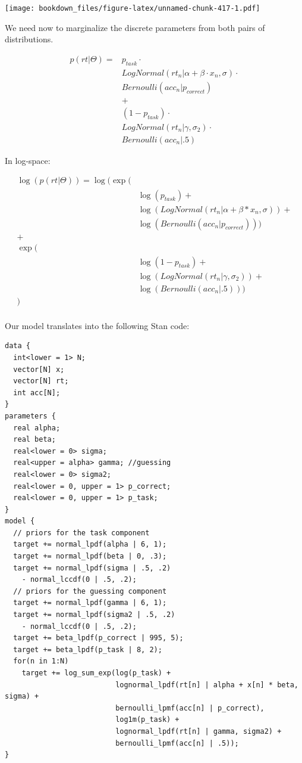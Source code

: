 \documentclass[12pt,]{krantz}
\theoremstyle{definition}
\theoremstyle{definition}
\theoremstyle{definition}
\theoremstyle{remark}
\begin{document}
\texttt{[image: bookdown\_files/figure-latex/unnamed-chunk-417-1.pdf]}

We need now to marginalize the discrete parameters from both pairs of
distributions.

\begin{equation}
\begin{aligned}
p(rt | \Theta) = & p_{task} \cdot \\
& LogNormal(rt_n | \alpha + \beta \cdot x_n, \sigma) \cdot \\
& Bernoulli(acc_n | p_{correct}) \\
& +\\ 
& (1 - p_{task}) \cdot \\
& LogNormal(rt_n | \gamma, \sigma_2) \cdot\\
& Bernoulli(acc_n | .5)
\end{aligned}
\end{equation}

In log-space:

\begin{equation}
\begin{aligned}
\log(p(rt | \Theta)) =  \log(\exp(&\\
& \log(p_{task}) +\\
  &\log(LogNormal(rt_n | \alpha + \beta * x_n, \sigma)) + \\
  &\log(Bernoulli(acc_n | p_{correct})))\\
  +&\\ 
 \exp(&\\
 & \log(1 - p_{task}) + \\
 & \log(LogNormal(rt_n |\gamma, \sigma_2)) + \\
 & \log(Bernoulli(acc_n | .5)))\\
    )& \\
\end{aligned}
\end{equation}

Our model translates into the following Stan code:

\begin{verbatim}
data {
  int<lower = 1> N;
  vector[N] x;
  vector[N] rt;
  int acc[N];
}
parameters {
  real alpha;
  real beta;
  real<lower = 0> sigma;
  real<upper = alpha> gamma; //guessing
  real<lower = 0> sigma2;
  real<lower = 0, upper = 1> p_correct;
  real<lower = 0, upper = 1> p_task;
}
model {
  // priors for the task component
  target += normal_lpdf(alpha | 6, 1);
  target += normal_lpdf(beta | 0, .3);
  target += normal_lpdf(sigma | .5, .2)
    - normal_lccdf(0 | .5, .2);
  // priors for the guessing component
  target += normal_lpdf(gamma | 6, 1);
  target += normal_lpdf(sigma2 | .5, .2)
    - normal_lccdf(0 | .5, .2);
  target += beta_lpdf(p_correct | 995, 5);
  target += beta_lpdf(p_task | 8, 2);
  for(n in 1:N)
    target += log_sum_exp(log(p_task) +
                          lognormal_lpdf(rt[n] | alpha + x[n] * beta, sigma) +
                          bernoulli_lpmf(acc[n] | p_correct),
                          log1m(p_task) +
                          lognormal_lpdf(rt[n] | gamma, sigma2) +
                          bernoulli_lpmf(acc[n] | .5));
}
\end{verbatim}
\end{document}
